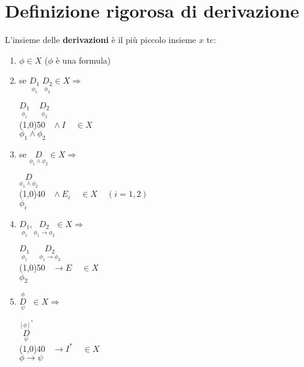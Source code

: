 \documentclass{article}
\theoremstyle{break}
\theoremstyle{break}
\theoremstyle{break}
\theoremstyle{break}
\begin{document}
\section{Definizione rigorosa di derivazione}
L'insieme delle \textbf{derivazioni} è il più piccolo insieme \( x \) tc:
\begin{enumerate}
    \item \( \phi \in X \) (\( \phi \) è una formula)
    \item se \( \underset{\phi_1}{D_1}\; \underset{\phi_2}{D_2} \in X \Rightarrow \)
        \begin{center}
             \(
            \underset{\phi_1}{D_1}\;\;\;\; \underset{\phi_2}{D_2}
            \)\\
            \hspace{1.8cm}\line(1,0){50}\(\;\;\; \wedge I\;\;\;\; \in X\)\\  
             \( \phi_1 \wedge \phi_2 \)
        \end{center}
    \item se \( \underset{\phi_1 \wedge \phi_2}{D} \in X  \Rightarrow\)
        \begin{center}
             \(
            \underset{\phi_1 \wedge \phi_2}{D}
            \)\\
            \hspace{3.8cm}\line(1,0){40}\(\;\;\; \wedge E_i\;\;\;\; \in X\;\;\;\; (i = 1,2)\)\\  
             \( \phi_i \)
        \end{center}

    \item \( \underset{\phi_1}{D_1}, \underset{\phi_1 \to \phi_2}{D_2} \in X \Rightarrow \)
        \begin{center}
             \(
            \underset{\phi_1}{D_1}\;\;\;\; \underset{\phi_1 \to \phi_2}{D_2}
            \)\\
            \hspace{2.1cm}\line(1,0){50}\(\;\;\; \to E\;\;\;\; \in X\)\\  
             \( \phi_2 \)
        \end{center}

    \item \( \underset{\psi}{\stackrel{\phi}{D}}\;\; \in X \Rightarrow \)
        \begin{center}
             \(
             \underset{\psi}{\stackrel{[\phi]^*}{D}}
            \)\\
            \hspace{2.3cm}\line(1,0){40}\(\;\;\; \to I^*\;\;\;\; \in X\)\\  
             \( \phi \to \psi \)
        \end{center}


\end{enumerate}
\end{document}
